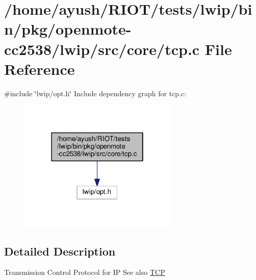 \hypertarget{bin_2pkg_2openmote-cc2538_2lwip_2src_2core_2tcp_8c}{}\section{/home/ayush/\+R\+I\+O\+T/tests/lwip/bin/pkg/openmote-\/cc2538/lwip/src/core/tcp.c File Reference}
\label{bin_2pkg_2openmote-cc2538_2lwip_2src_2core_2tcp_8c}
{\ttfamily \#include \char`\"{}lwip/opt.\+h\char`\"{}}\newline
Include dependency graph for tcp.\+c\+:
\nopagebreak
\begin{figure}[H]
\begin{center}
\leavevmode
\includegraphics[width=214pt]{bin_2pkg_2openmote-cc2538_2lwip_2src_2core_2tcp_8c__incl}
\end{center}
\end{figure}


\subsection{Detailed Description}
Transmission Control Protocol for IP See also \hyperlink{group__tcp__raw}{T\+CP} 
